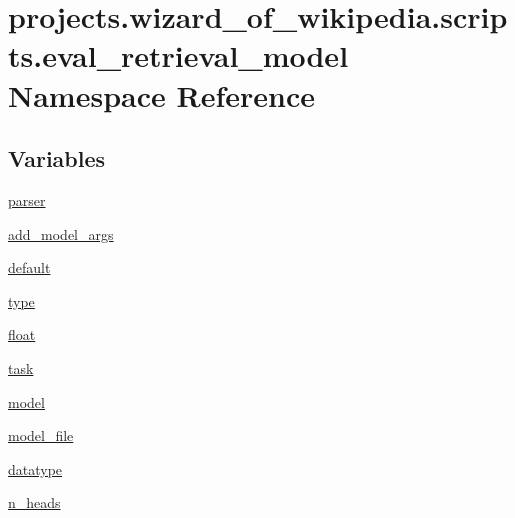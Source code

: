 \hypertarget{namespaceprojects_1_1wizard__of__wikipedia_1_1scripts_1_1eval__retrieval__model}{}\section{projects.\+wizard\+\_\+of\+\_\+wikipedia.\+scripts.\+eval\+\_\+retrieval\+\_\+model Namespace Reference}
\label{namespaceprojects_1_1wizard__of__wikipedia_1_1scripts_1_1eval__retrieval__model}
\subsection*{Variables}
\begin{DoxyCompactItemize}
\item 
\hyperlink{namespaceprojects_1_1wizard__of__wikipedia_1_1scripts_1_1eval__retrieval__model_a34e16cfd6f3b5f0f7862d12015cff906}{parser}
\item 
\hyperlink{namespaceprojects_1_1wizard__of__wikipedia_1_1scripts_1_1eval__retrieval__model_a4292ce71363be2e979d730f31cbef28f}{add\+\_\+model\+\_\+args}
\item 
\hyperlink{namespaceprojects_1_1wizard__of__wikipedia_1_1scripts_1_1eval__retrieval__model_a990de8456f40c15f5adae005e1791e0e}{default}
\item 
\hyperlink{namespaceprojects_1_1wizard__of__wikipedia_1_1scripts_1_1eval__retrieval__model_ab86c7688750e6401627c950e1cc4dec4}{type}
\item 
\hyperlink{namespaceprojects_1_1wizard__of__wikipedia_1_1scripts_1_1eval__retrieval__model_a5d9265fb70b57e0dc7fb2d7a4f9318a2}{float}
\item 
\hyperlink{namespaceprojects_1_1wizard__of__wikipedia_1_1scripts_1_1eval__retrieval__model_ad9fbaa9e3d4bdd2e61231866f3e9ff8d}{task}
\item 
\hyperlink{namespaceprojects_1_1wizard__of__wikipedia_1_1scripts_1_1eval__retrieval__model_adabee7ea9d8da003508fd0bacebb70fb}{model}
\item 
\hyperlink{namespaceprojects_1_1wizard__of__wikipedia_1_1scripts_1_1eval__retrieval__model_ac157d6348174ac205e8c3bda7b7d293d}{model\+\_\+file}
\item 
\hyperlink{namespaceprojects_1_1wizard__of__wikipedia_1_1scripts_1_1eval__retrieval__model_ad045cf4630e369b52c99c73b080f7bbf}{datatype}
\item 
\hyperlink{namespaceprojects_1_1wizard__of__wikipedia_1_1scripts_1_1eval__retrieval__model_a75fc1e002ce9bcd258f81f37596097eb}{n\+\_\+heads}

\end{DoxyCompactItemize}
